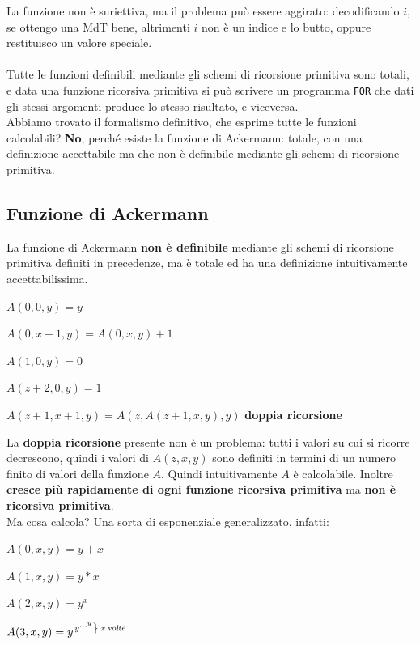 \documentclass[10pt]{book}
\begin{document}
La funzione non è suriettiva, ma il problema può essere aggirato: decodificando $i$, se ottengo una MdT bene, altrimenti $i$ non è un indice e lo butto, oppure restituisco un valore speciale.\\\\
Tutte le funzioni definibili mediante gli schemi di ricorsione primitiva sono totali, e data una funzione ricorsiva primitiva si può scrivere un programma \texttt{FOR} che dati gli stessi argomenti produce lo stesso risultato, e viceversa.\\
Abbiamo trovato il formalismo definitivo, che esprime tutte le funzioni calcolabili? \textbf{No}, perché esiste la funzione di Ackermann: totale, con una definizione accettabile ma che non è definibile mediante gli schemi di ricorsione primitiva.
\subsection{Funzione di Ackermann}
La funzione di Ackermann \textbf{non è definibile} mediante gli schemi di ricorsione primitiva definiti in precedenze, ma è totale ed ha una definizione intuitivamente accettabilissima.

\begin{list}{}{}
	\item $A(0, 0, y) = y$
	\item $A(0, x + 1, y) = A(0, x, y) + 1$
	\item $A(1, 0, y) = 0$
	\item $A(z + 2, 0, y) = 1$
	\item $A(z + 1, x + 1, y) = A(z, A(z + 1, x, y), y)$ \textbf{doppia ricorsione}

\end{list}
La \textbf{doppia ricorsione} presente non è un problema: tutti i valori su cui si ricorre decrescono, quindi i valori di $A(z, x, y)$ sono definiti in termini di un numero finito di valori della funzione $A$. Quindi intuitivamente $A$ è calcolabile. Inoltre \textbf{cresce più rapidamente di ogni funzione ricorsiva primitiva} ma \textbf{non è ricorsiva primitiva}.\\
Ma cosa calcola? Una sorta di esponenziale generalizzato, infatti:
\begin{list}{}{}
	\item $A(0, x, y) = y + x$
	\item $A(1, x, y) = y * x$
	\item $A(2, x, y) = y^x$
	\item $A(3, x, y) = y^{\left.y^{\ldots^y}\right\} \:x\:\textsl{volte}}$
\end{list}
\pagebreak
\end{document}
